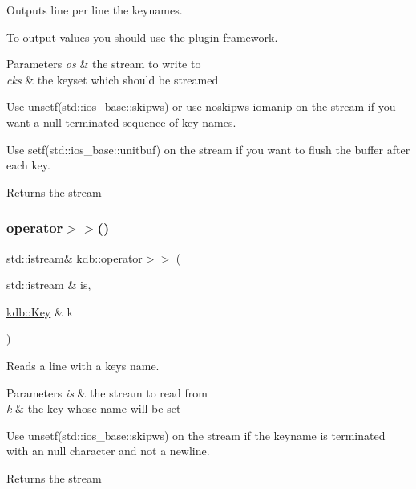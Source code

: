 Outputs line per line the keynames. 

To output values you should use the plugin framework.


\begin{DoxyParams}{Parameters}
{\em os} & the stream to write to \\
\hline
{\em cks} & the keyset which should be streamed\\
\hline
\end{DoxyParams}
Use unsetf(std\+::ios\+\_\+base\+::skipws) or use noskipws iomanip on the stream if you want a null terminated sequence of key names.

Use setf(std\+::ios\+\_\+base\+::unitbuf) on the stream if you want to flush the buffer after each key.

\begin{DoxyReturn}{Returns}
the stream 
\end{DoxyReturn}
\mbox{\label{namespacekdb_a66342865d6cdbb19075f52d92e7a61b1}} 
\subsubsection{\texorpdfstring{operator$>$$>$()}{operator>>()}\hspace{0.1cm}{\footnotesize\ttfamily [1/2]}}
{\footnotesize\ttfamily std\+::istream\& kdb\+::operator$>$$>$ (\begin{DoxyParamCaption}\item[{std\+::istream \&}]{is,  }\item[{\hyperlink{classkdb_1_1Key}{kdb\+::\+Key} \&}]{k }\end{DoxyParamCaption})\hspace{0.3cm}{\ttfamily [inline]}}



Reads a line with a keys name. 


\begin{DoxyParams}{Parameters}
{\em is} & the stream to read from \\
\hline
{\em k} & the key whose name will be set\\
\hline
\end{DoxyParams}
Use unsetf(std\+::ios\+\_\+base\+::skipws) on the stream if the keyname is terminated with an null character and not a newline.

\begin{DoxyReturn}{Returns}
the stream 
\end{DoxyReturn}
\mbox{\label{namespacekdb_ac4479a9f39ed65ffd251161bcaf8ea89}} 
